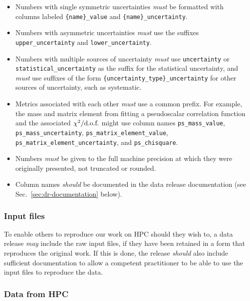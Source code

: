 \documentclass{article}
\newcommand\rfcword[1]{\emph{#1}\xspace}
\newcommand\must{\rfcword{must}}
\newcommand\should{\rfcword{should}}
\newcommand\may{\rfcword{may}}
\begin{document}
\begin{itemize}
  \item
        Numbers with single symmetric uncertainties \must be formatted with columns labeled
        \verb|{name}_value| and \verb|{name}_uncertainty|.
  \item
        Numbers with asymmetric uncertainties \must use the suffixes
        \verb|upper_uncertainty| and \verb|lower_uncertainty|.
  \item
        Numbers with multiple sources of uncertainty \must use
        \verb|uncertainty| or \verb|statistical_uncertainty|
        as the suffix for the statistical uncertainty,
        and \must use suffixes of the form
        \verb|{uncertainty_type}_uncertainty|
        for other sources of uncertainty,
        such as systematic.
  \item
        Metrics associated with each other \must use a common prefix.
        For example,
        the mass and matrix element from fitting a pseudoscalar correlation function
        and the associated $\chi^{2}/\textnormal{d.o.f.}$
        might use column names
        \verb|ps_mass_value|,
        \verb|ps_mass_uncertainty|,
        \verb|ps_matrix_element_value|,
        \verb|ps_matrix_element_uncertainty|,
        and \verb|ps_chisquare|.
  \item
        Numbers \must be given to the full machine precision at which they were originally presented,
        not truncated or rounded.
  \item
        Column names \should be documented in the data release documentation
        (see Sec.~\ref{sec:dr-documentation} below).
\end{itemize}

\subsubsection{Input files}

To enable others to reproduce our work on HPC should they wish to,
a data release \may include the raw input files,
if they have been retained in a form that reproduces the original work.
If this is done,
the release \should also include sufficient documentation
to allow a competent practitioner to be able to use the input files to reproduce the data.

\subsubsection{Data from HPC}\label{sec:dr-from-hpc}
\end{document}
